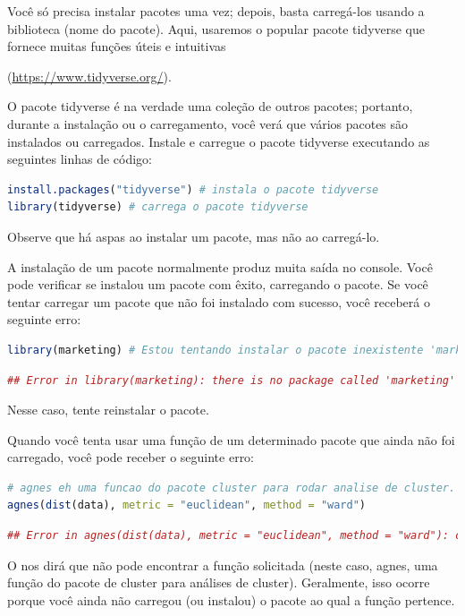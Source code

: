 \documentclass{article}
\begin{document}
Você só precisa instalar pacotes uma vez; depois, basta carregá-los usando a biblioteca (nome do pacote). Aqui, usaremos o popular pacote tidyverse que fornece muitas funções úteis e intuitivas

 (\href{https://www.tidyverse.org/}{https://www.tidyverse.org/}).
 
O pacote tidyverse é na verdade uma coleção de outros pacotes; portanto, durante a instalação ou o carregamento, você verá que vários pacotes são instalados ou carregados. Instale e carregue o pacote tidyverse executando as seguintes linhas de código:

\begin{lstlisting}[language=R]
install.packages("tidyverse") # instala o pacote tidyverse
library(tidyverse) # carrega o pacote tidyverse
\end{lstlisting}

Observe que há aspas ao instalar um pacote, mas não ao carregá-lo.

A instalação de um pacote normalmente produz muita saída no console. Você pode verificar se instalou um pacote com êxito, carregando o pacote. Se você tentar carregar um pacote que não foi instalado com sucesso, você receberá o seguinte erro:
\begin{lstlisting}[language=R]
library(marketing) # Estou tentando instalar o pacote inexistente 'marketing'
\end{lstlisting}

\begin{lstlisting}[language=R]
## Error in library(marketing): there is no package called 'marketing'
\end{lstlisting}


Nesse caso, tente reinstalar o pacote.

Quando você tenta usar uma função de um determinado pacote que ainda não foi carregado, você pode receber o seguinte erro:

\begin{lstlisting}[language=R]
# agnes eh uma funcao do pacote cluster para rodar analise de cluster.
agnes(dist(data), metric = "euclidean", method = "ward")
\end{lstlisting}
\begin{lstlisting}[language=R]
## Error in agnes(dist(data), metric = "euclidean", method = "ward"): could not find function "agnes"
\end{lstlisting}

O \faRProject nos dirá que não pode encontrar a função solicitada (neste caso, agnes, uma função do pacote de cluster para análises de cluster). Geralmente, isso ocorre porque você ainda não carregou (ou instalou) o pacote ao qual a função pertence.
\end{document}
